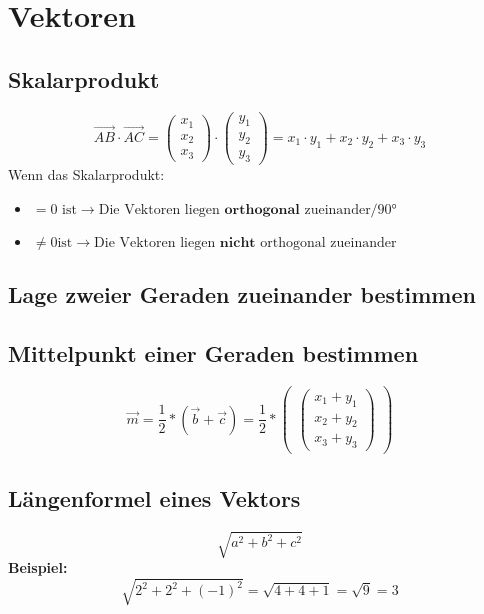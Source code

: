 \section{Vektoren}
	\subsection{Skalarprodukt}
		$$
		\vec{AB} \cdot \vec{AC} = 
		\begin{pmatrix} 
			x_{1} \\
			x_{2} \\
			x_{3} 
		\end{pmatrix}
		\cdot 
		\begin{pmatrix} 
			y_{1} \\
			y_{2} \\
			y_{3}
		\end{pmatrix} = x_{1} \cdot y_{1}+x_{2} \cdot y_{2}+x_{3} \cdot y_{3}
		$$
		Wenn das Skalarprodukt:
			\begin{itemize}
				\item $=0 \text{ ist} \rightarrow \text{Die Vektoren liegen } \textbf{orthogonal } \text{zueinander/90°}$
				\item $\neq 0 \text{ist} \rightarrow \text{Die Vektoren liegen } \textbf{nicht } \text{orthogonal zueinander}$
			\end{itemize}
	\subsection{Lage zweier Geraden zueinander bestimmen}
	\subsection{Mittelpunkt einer Geraden bestimmen}
		$$
\vec{m} = \frac{1}{2}*(\vec{b}+\vec{c})=\frac{1}{2}*
\begin{pmatrix}
\begin{pmatrix} 
x_{1}+y_{1} \\
x_{2}+y_{2} \\
x_{3}+y_{3}
\end{pmatrix}
\end{pmatrix}
$$
	\subsection{Längenformel eines Vektors}
		$$
\sqrt{a^{2}+b^{2}+c^{2}}
$$
		\textbf{Beispiel:}
		$$
\sqrt{2^{2}+2^{2}+(-1)^{2}}=
\sqrt{4+4+1}=
\sqrt{9}=3
$$
